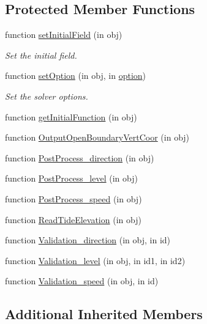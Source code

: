 \subsection*{Protected Member Functions}
\begin{DoxyCompactItemize}
\item 
function \hyperlink{class_sanya_a624f9917b7802d63efdf71eb9c134643}{set\+Initial\+Field} (in obj)
\begin{DoxyCompactList}\small\item\em Set the initial field. \end{DoxyCompactList}\item 
function \hyperlink{class_sanya_ab70365b8ce5e40a6c0081d20524d01d2}{set\+Option} (in obj, in \hyperlink{class_ndg_phys_af91f4c54b93504e76b38a5693774dff1}{option})
\begin{DoxyCompactList}\small\item\em Set the solver options. \end{DoxyCompactList}\item 
function \hyperlink{class_sanya_a28fafaae47f19a25e9e2a8bafb009baa}{get\+Initial\+Function} (in obj)
\item 
function \hyperlink{class_sanya_a28c7cc126cf26b74aefa75b4c8d5e0cb}{Output\+Open\+Boundary\+Vert\+Coor} (in obj)
\item 
function \hyperlink{class_sanya_af9a6d489299805e94938acdc2d84b448}{Post\+Process\+\_\+direction} (in obj)
\item 
function \hyperlink{class_sanya_a8a5100e9c105dc2496c7589c0a93ce24}{Post\+Process\+\_\+level} (in obj)
\item 
function \hyperlink{class_sanya_a196bc12a9c63098bdb2b0b2cc25269e0}{Post\+Process\+\_\+speed} (in obj)
\item 
function \hyperlink{class_sanya_a3fb01627e16128d771f249dd95d8c189}{Read\+Tide\+Elevation} (in obj)
\item 
function \hyperlink{class_sanya_ade239b8bd0dca435cdf63545a02f7e86}{Validation\+\_\+direction} (in obj, in id)
\item 
function \hyperlink{class_sanya_aa2a87328de59bfe468561bac287dd373}{Validation\+\_\+level} (in obj, in id1, in id2)
\item 
function \hyperlink{class_sanya_a876b9f8292887c87692a1b5b392e4e71}{Validation\+\_\+speed} (in obj, in id)
\end{DoxyCompactItemize}
\subsection*{Additional Inherited Members}


